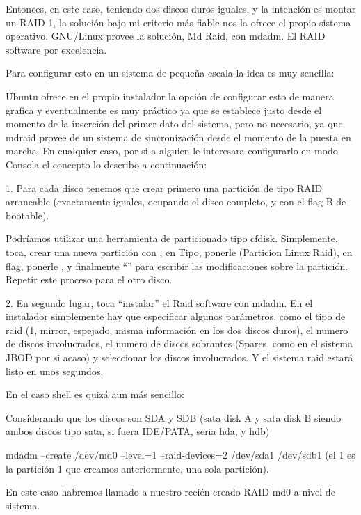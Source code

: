 Entonces, en este caso, teniendo dos discos duros iguales, y la intención es montar un RAID 1, la solución bajo mi criterio más fiable nos la ofrece el propio sistema operativo. GNU/Linux provee la solución, Md Raid, con mdadm. El RAID software por excelencia.

Para configurar esto en un sistema de pequeña escala la idea es muy sencilla:

Ubuntu ofrece en el propio instalador la opción de configurar esto de manera grafica y eventualmente es muy práctico ya que se establece justo desde el momento de la inserción del primer dato del sistema, pero no necesario, ya que mdraid provee de un sistema de sincronización desde el momento de la puesta en marcha. En cualquier caso, por si a alguien le interesara configurarlo en modo Consola el concepto lo describo a continuación:

1. Para cada disco tenemos que crear primero una partición de tipo RAID arrancable (exactamente iguales, ocupando el disco completo, y con el flag B de bootable).

Podríamos utilizar una herramienta de particionado tipo cfdisk. Simplemente, toca, crear una nueva partición con , en Tipo, ponerle  (Particion Linux Raid), en flag, ponerle , y finalmente “” para escribir las modificaciones sobre la partición. Repetir este proceso para el otro disco. 

2. En segundo lugar, toca “instalar” el Raid software con mdadm. En el instalador simplemente hay que especificar algunos parámetros, como el tipo de raid (1, mirror, espejado, misma información en los dos discos duros), el numero de discos involucrados, el numero de discos sobrantes (Spares, como en el sistema JBOD por si acaso) y seleccionar los discos involucrados. Y el sistema raid estará listo en unos segundos.

En el caso shell es quizá aun más sencillo:

Considerando que los discos son SDA y SDB (sata disk A y sata disk B siendo ambos discos tipo sata, si fuera IDE/PATA, seria hda, y hdb)

mdadm –create /dev/md0 –level=1 –raid-devices=2 /dev/sda1 /dev/sdb1 (el 1 es la partición 1 que creamos anteriormente, una sola partición).

En este caso habremos llamado a nuestro recién creado RAID md0 a nivel de sistema.

